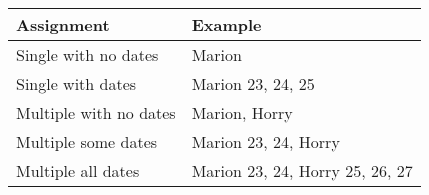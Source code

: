 \begin{tabular}{|l|l|}
\hline
\textbf{Assignment} & \textbf{Example}                \\ \hline
Single with no dates             & Marion                          \\ \hline
Single with dates   & Marion 23, 24, 25               \\ \hline
Multiple with no dates  & Marion, Horry                   \\ \hline
Multiple some dates & Marion 23, 24, Horry            \\ \hline
Multiple all dates  & Marion 23, 24, Horry 25, 26, 27 \\ \hline
\end{tabular}
